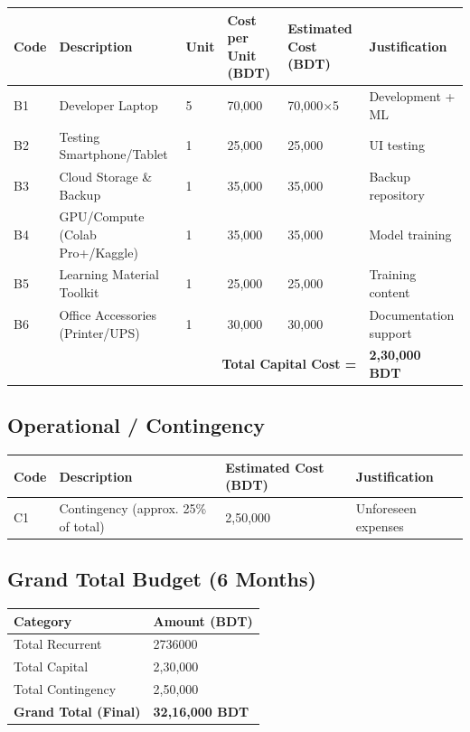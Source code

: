 \documentclass[12pt,letterpaper]{article}
\begin{document}
\begin{longtable}{|p{1cm}|p{3.5cm}|p{1cm}|p{2.5cm}|p{2.5cm}|p{3.5cm}|}
\hline
\textbf{Code} & \textbf{Description} & \textbf{Unit} & \textbf{Cost per Unit (BDT)} & \textbf{Estimated Cost (BDT)} & \textbf{Justification} \\
\hline
B1 & Developer Laptop & 5 & 70,000 & 70,000×5 & Development + ML \\
\hline
B2 & Testing Smartphone/Tablet & 1 & 25,000 & 25,000 & UI testing \\
\hline
B3 & Cloud Storage \& Backup & 1 & 35,000 & 35,000 & Backup repository \\
\hline
B4 & GPU/Compute (Colab Pro+/Kaggle) & 1 & 35,000 & 35,000 & Model training \\
\hline
B5 & Learning Material Toolkit & 1 & 25,000 & 25,000 & Training content \\
\hline
B6 & Office Accessories (Printer/UPS) & 1 & 30,000 & 30,000 & Documentation support \\
\hline
\multicolumn{5}{|r|}{\textbf{Total Capital Cost =}} & \textbf{2,30,000 BDT} \\
\hline
\end{longtable}

\subsection{Operational / Contingency}

\begin{longtable}{|p{1cm}|p{5cm}|p{3cm}|p{4cm}|}
\hline
\textbf{Code} & \textbf{Description} & \textbf{Estimated Cost (BDT)} & \textbf{Justification} \\
\hline
C1 & Contingency (approx. 25\% of total) & 2,50,000 & Unforeseen expenses \\
\hline
\end{longtable}

\subsection{Grand Total Budget (6 Months)}

\begin{longtable}{|p{4cm}|p{3cm}|}
\hline
\textbf{Category} & \textbf{Amount (BDT)} \\
\hline
Total Recurrent & 2736000 \\
\hline
Total Capital & 2,30,000 \\
\hline
Total Contingency & 2,50,000 \\
\hline
{\Large\textbf{Grand Total (Final)}} & {\Large\textbf{32,16,000 BDT}} \\
\hline
\end{longtable}
\end{document}
